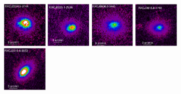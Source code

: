 \documentclass[oldversion]{aa}
\begin{document}
\begin{figure}[]
\includegraphics[scale=1.,angle=0,keepaspectratio,width=0.195\textwidth]{0944fa2k.ps}
\hfill
\includegraphics[scale=1.,angle=0,keepaspectratio,width=0.195\textwidth]{0944fa2l.ps}
\hfill
\includegraphics[scale=1.,angle=0,keepaspectratio,width=0.195\textwidth]{0944fa2m.ps}
\hfill
\includegraphics[scale=1.,angle=0,keepaspectratio,width=0.195\textwidth]{0944fa2n.ps}
\hfill
\includegraphics[scale=1.,angle=0,keepaspectratio,width=0.195\textwidth]{0944fa2o.ps}



\end{figure}
\end{document}
